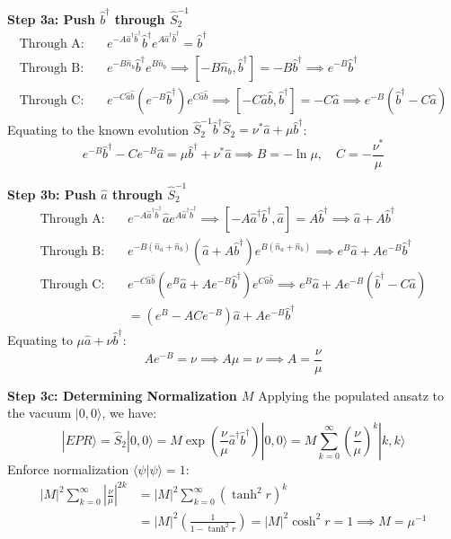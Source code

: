 {\textbf{Step 3a: Push $\hat{b}^\dagger$ through $\hat{S}_2^{-1}$}
\begin{align*}
\text{Through A:} \quad & e^{-A\hat{a}^\dagger\hat{b}^\dagger} \hat{b}^\dagger e^{A\hat{a}^\dagger\hat{b}^\dagger} = \hat{b}^\dagger \\
\text{Through B:} \quad & e^{-B\hat{n}_b} \hat{b}^\dagger e^{B\hat{n}_b} \implies [-B\hat{n}_b, \hat{b}^\dagger] = -B\hat{b}^\dagger \implies e^{-B}\hat{b}^\dagger \\
\text{Through C:} \quad & e^{-C\hat{a}\hat{b}} (e^{-B}\hat{b}^\dagger) e^{C\hat{a}\hat{b}} \implies [-C\hat{a}\hat{b}, \hat{b}^\dagger] = -C\hat{a} \implies e^{-B}(\hat{b}^\dagger - C\hat{a})
\end{align*}
Equating to the known evolution $\hat{S}_2^{-1} \hat{b}^\dagger \hat{S}_2 = \nu^*\hat{a} + \mu\hat{b}^\dagger$:
\begin{equation*}
e^{-B}\hat{b}^\dagger - Ce^{-B}\hat{a} = \mu\hat{b}^\dagger + \nu^*\hat{a} \implies B = -\ln\mu, \quad C = -\frac{\nu^*}{\mu}
\end{equation*}

\textbf{Step 3b: Push $\hat{a}$ through $\hat{S}_2^{-1}$}
\begin{align*}
\text{Through A:} \quad & e^{-A\hat{a}^\dagger\hat{b}^\dagger} \hat{a} e^{A\hat{a}^\dagger\hat{b}^\dagger} \implies [-A\hat{a}^\dagger\hat{b}^\dagger, \hat{a}] = A\hat{b}^\dagger \implies \hat{a} + A\hat{b}^\dagger \\
\text{Through B:} \quad & e^{-B(\hat{n}_a+\hat{n}_b)} (\hat{a} + A\hat{b}^\dagger) e^{B(\hat{n}_a+\hat{n}_b)} \implies e^B\hat{a} + Ae^{-B}\hat{b}^\dagger \\
\text{Through C:} \quad & e^{-C\hat{a}\hat{b}} (e^B\hat{a} + Ae^{-B}\hat{b}^\dagger) e^{C\hat{a}\hat{b}} \implies e^B\hat{a} + Ae^{-B}(\hat{b}^\dagger - C\hat{a}) \\
& = (e^B - ACe^{-B})\hat{a} + Ae^{-B}\hat{b}^\dagger
\end{align*}
Equating to $\mu\hat{a} + \nu\hat{b}^\dagger$:
\begin{equation*}
Ae^{-B} = \nu \implies A\mu = \nu \implies A = \frac{\nu}{\mu}
\end{equation*}

\textbf{Step 3c: Determining Normalization $M$}
Applying the populated ansatz to the vacuum $|0,0\rangle$, we have:
\begin{equation*}
|EPR\rangle = \hat{S}_2|0,0\rangle = M \exp\left(\frac{\nu}{\mu}\hat{a}^\dagger\hat{b}^\dagger\right)|0,0\rangle = M \sum_{k=0}^{\infty} \left(\frac{\nu}{\mu}\right)^k |k,k\rangle
\end{equation*}
Enforce normalization $\langle \psi | \psi \rangle = 1$:
\begin{align*}
|M|^2 \sum_{k=0}^{\infty} \left|\frac{\nu}{\mu}\right|^{2k} &= |M|^2 \sum_{k=0}^{\infty} (\tanh^2 r)^k \\
&= |M|^2 \left(\frac{1}{1 - \tanh^2 r}\right) = |M|^2 \cosh^2 r = 1 \implies M = \mu^{-1}
\end{align*}

}

